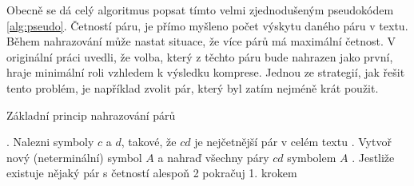 \documentclass[a4paper,12pt]{article}
\begin{document}
Obecně se dá celý algoritmus popsat tímto velmi zjednodušeným pseudokódem \ref{alg:pseudo}. Četností páru, je přímo myšleno počet výskytu daného páru v textu. Během nahrazování může nastat situace, že více párů má maximální četnost. V originální práci uvedli, že volba, který z těchto páru bude nahrazen jako první, hraje minimální roli vzhledem \linebreak k výsledku komprese. Jednou ze strategií, jak řešit tento problém, je například zvolit pár, který byl zatím nejméně krát použit.

\begin{algorithm}
    \caption{Základní princip nahrazování párů}
    \begin{algorithmic}
        . Nalezni symboly $c$ a $d$, takové, že $cd$ je nejčetnější pár v celém textu
        . Vytvoř nový (neterminální) symbol $A$ a nahraď všechny páry $cd$ symbolem $A$
        . Jestliže existuje nějaký pár s četností alespoň 2 pokračuj 1. krokem
    \end{algorithmic}
    \label{alg:pseudo}
\end{algorithm}
\end{document}
